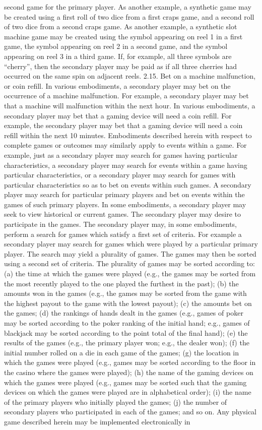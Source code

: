 \documentclass[11pt,a4paper]{article}
\begin{document}
second game for the primary player. As another example, a synthetic game may be created using a first roll of two dice from a first craps game, and a second roll of two dice from a second craps game. As another example, a synthetic slot machine game may be created using the symbol appearing on reel 1 in a first game, the symbol appearing on reel 2 in a second game, and the symbol appearing on reel 3 in a third game. If, for example, all three symbols are “cherry”, then the secondary player may be paid as if all three cherries had occurred on the same spin on adjacent reels. 2.15. Bet on a machine malfunction, or coin refill. In various embodiments, a secondary player may bet on the occurrence of a machine malfunction. For example, a secondary player may bet that a machine will malfunction within the next hour. In various embodiments, a secondary player may bet that a gaming device will need a coin refill. For example, the secondary player may bet that a gaming device will need a coin refill within the next 10 minutes. Embodiments described herein with respect to complete games or outcomes may similarly apply to events within a game. For example, just as a secondary player may search for games having particular characteristics, a secondary player may search for events within a game having particular characteristics, or a secondary player may search for games with particular characteristics so as to bet on events within such games. A secondary player may search for particular primary players and bet on events within the games of such primary players. In some embodiments, a secondary player may seek to view historical or current games. The secondary player may desire to participate in the games. The secondary player may, in some embodiments, perform a search for games which satisfy a first set of criteria. For example a secondary player may search for games which were played by a particular primary player. The search may yield a plurality of games. The games may then be sorted using a second set of criteria. The plurality of games may be sorted according to: (a) the time at which the games were played (e.g., the games may be sorted from the most recently played to the one played the furthest in the past); (b) the amounts won in the games (e.g., the games may be sorted from the game with the highest payout to the game with the lowest payout); (c) the amounts bet on the games; (d) the rankings of hands dealt in the games (e.g., games of poker may be sorted according to the poker ranking of the initial hand; e.g., games of blackjack may be sorted according to the point total of the final hand); (e) the results of the games (e.g., the primary player won; e.g., the dealer won); (f) the initial number rolled on a die in each game of the games; (g) the location in which the games were played (e.g., games may be sorted according to the floor in the casino where the games were played); (h) the name of the gaming devices on which the games were played (e.g., games may be sorted such that the gaming devices on which the games were played are in alphabetical order); (i) the name of the primary players who initially played the games; (j) the number of secondary players who participated in each of the games; and so on. Any physical game described herein may be implemented electronically in 
\end{document}
